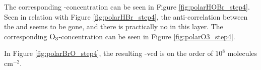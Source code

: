 \medskip






\medskip

The corresponding -concentration can be seen in Figure \ref{fig:polarHOBr_step4}. Seen in relation with Figure \ref{fig:polarHBr_step4}, the anti-correlation between the  and  seems to be gone, and there is practically no  in this layer. The corresponding $\mathrm{O_3}$-concentration can be seen in Figure \ref{fig:polarO3_step4}.



\medskip

In Figure \ref{fig:polarBrO_step4}, the resulting  -\acrshort{vcd} is on the order of $10^{8}$ molecules cm$^{-2}$. 











